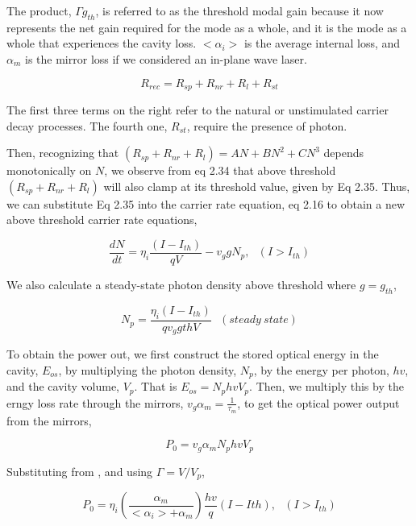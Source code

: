 The product, $\Gamma{g_{th}}$, is referred to as the threshold modal gain
because it now represents the net gain required for the mode as a whole, and it
is the mode as a whole that experiences the cavity loss. $<\alpha_i>$ is the
average internal loss, and $\alpha_m$ is the mirror loss if we considered an
in-plane wave laser.

\begin{equation}
  R_{rec} = R_{sp} + R_{nr} + R_{l} + R_{st}
\end{equation}

The first three terms on the right refer to the natural or unstimulated carrier
decay processes. The fourth one, $R_{st}$, require the presence of photon.


Then, recognizing that $(R_{sp} + R_{nr} + R_{l}) =AN + BN^2 +CN^3$ depends
monotonically on $N$, we observe from eq 2.34 that above threshold $(R_{sp} +
R_{nr} + R_{l})$ will also clamp at its threshold value, given by Eq 2.35. Thus,
we can substitute Eq 2.35 into the carrier rate equation, eq 2.16 to obtain a
new above threshold carrier rate equations,

\begin{equation}
  \frac{dN}{dt} = \eta_i \frac{(I - I_{th})}{qV} - v_{g}gN_p,~~~   (I > I_{th})
\end{equation}

We also calculate a steady-state photon density above threshold where $g = g_{th}$,

\begin{equation}
  N_p = \frac{\eta_i (I - I_{th})}{qv_{g}g{th}V}~~~   (steady~ state)
\end{equation}

To obtain the power out, we first construct the stored optical energy in the
cavity, $E_{os}$, by multiplying the photon density, $N_p$, by the energy per
photon, $hv$, and the cavity volume, $V_p$. That is $E_{os} = N_phvV_p$. Then,
we multiply this by the erngy loss rate through the mirrors, $v_g\alpha_m =
\frac{1}{\tau_m}$, to get the optical power output from the mirrors,

\begin{equation}
  P_0 = v_g\alpha_{m}N_phvV_p
\end{equation}

Substituting from , and using $\Gamma = V/V_p$,

\begin{equation}
  P_0 = \eta_i(\frac{\alpha_m}{<\alpha_i> + \alpha_m})\frac{hv}{q}(I - I{th}),~~~(I > I_{th})
\end{equation}


